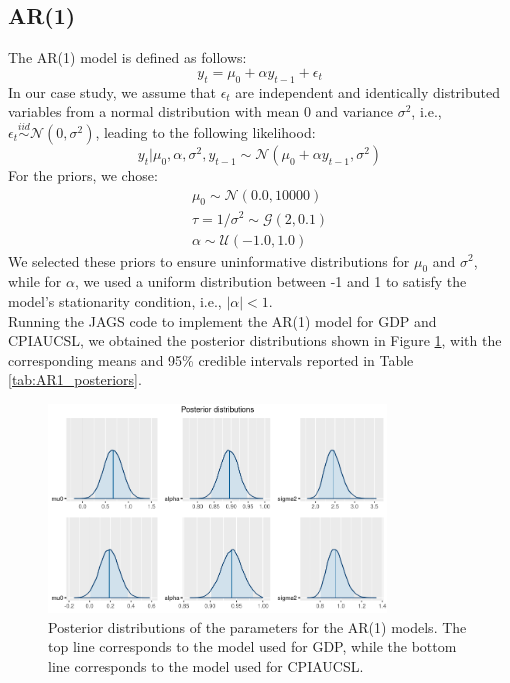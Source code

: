\subsection*{AR(1)}
The AR(1) model is defined as follows:
\begin{equation}
    \label{eq:AR1}
    y_{t} = \mu_{0} + \alpha y_{t-1} + \epsilon_t
\end{equation}
In our case study, we assume that $\epsilon_t$ are independent and identically distributed variables from a normal distribution with mean $0$ and variance $\sigma^2$, i.e., $\epsilon_t \stackrel{iid}{\sim} \mathcal{N}(0,\sigma^2)$, leading to the following likelihood:
\begin{equation}
    \label{eq:AR1_likelihood}
    y_{t}|\mu_{0},\alpha,\sigma^2,y_{t-1} \sim \mathcal{N}(\mu_{0} + \alpha y_{t-1}, \sigma^2)
\end{equation}
For the priors, we chose:
\begin{equation}
    \label{eq:AR1_priors}
    \begin{split}
        \mu_0 \sim \mathcal{N}(0.0, 10000) \\
        \tau = 1 / \sigma^2 \sim \mathcal{G}(2, 0.1) \\
        \alpha \sim \mathcal{U}(-1.0, 1.0)
    \end{split}
\end{equation}
We selected these priors to ensure uninformative distributions for $\mu_{0}$ and $\sigma^2$, while for $\alpha$, we used a uniform distribution between -1 and 1 to satisfy the model's stationarity condition, i.e., $|\alpha| < 1$. \\
Running the JAGS code to implement the AR(1) model for GDP and CPIAUCSL, we obtained the posterior distributions shown in Figure \ref{fig:AR1_posteriors}, with the corresponding means and 95\% credible intervals reported in Table \ref{tab:AR1_posteriors}. \\
\begin{figure}[h]
    \centering
    \includegraphics[width=0.8\textwidth]{images/2-AR/posteriors.png}
    \caption{Posterior distributions of the parameters for the AR(1) models. The top line corresponds to the model used for GDP, while the bottom line corresponds to the model used for CPIAUCSL.}
    \label{fig:AR1_posteriors}
\end{figure}
